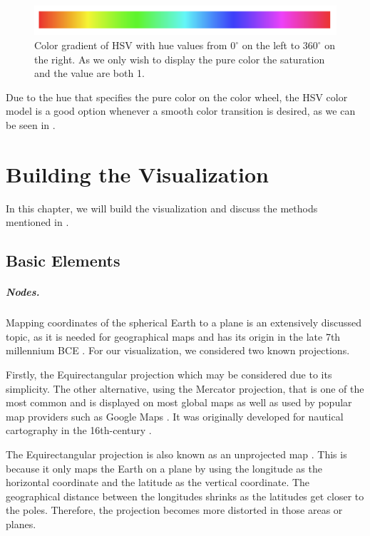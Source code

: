 \documentclass
[
    paper = a4,
    pagesize,
    12 pt,
    twoside,                       %
    open = right,
    DIV = calc,
    BCOR = 0 mm,                   %
    bibtotoc
]
{scrbook}
\begin{document}
\begin{figure}[H]
  \begin{minipage}{\textwidth}
    \includegraphics[width=\textwidth]{Images/hsv.png}
    \caption[]{Color gradient of HSV with hue values from $0^\circ$ on the left to $360^\circ$ on the right. As we only wish to display the pure color the saturation and the value are both 1.}
    \label{fig:hsv}
    \end{minipage}
\end{figure}

Due to the hue that specifies the pure color on the color wheel, the HSV color model is a good option whenever a smooth color transition is desired, as we can be seen in  .

\chapter{Building the Visualization} \label{main}

In this chapter, we will build the visualization and discuss the methods mentioned in .

\section{Basic Elements} \label{graph}

\paragraph{Nodes.}
Mapping coordinates of the spherical Earth to a plane is an extensively discussed topic, as it is needed for geographical maps and has its origin in the late 7th millennium BCE \cite{cartography}.
For our visualization, we considered two known projections.

Firstly, the Equirectangular projection which may be considered due to its simplicity.
The other alternative, using the Mercator projection, that is one of the most common and is displayed on most global maps as well as used by popular map providers such as Google Maps \cite{google_maps}.
It was originally developed for nautical cartography in the 16th-century \cite{mercator}.

The Equirectangular projection is also known as an unprojected map \cite{equirectangular}.
This is because it only maps the Earth on a plane by using the longitude as the horizontal coordinate and the latitude as the vertical coordinate.
The geographical distance between the longitudes shrinks as the latitudes get closer to the poles.
Therefore, the projection becomes more distorted in those areas or planes.
\end{document}
